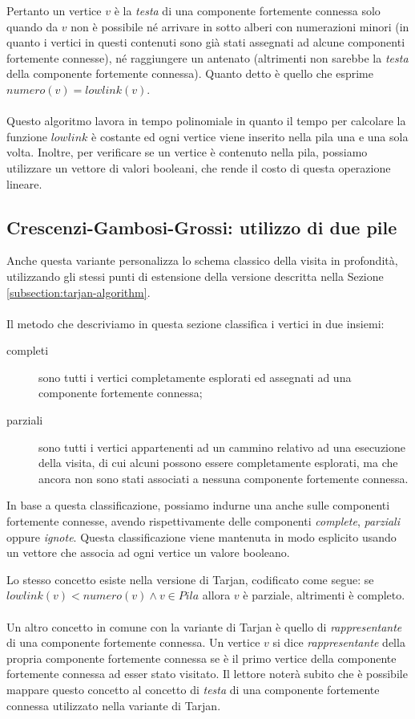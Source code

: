 Pertanto un vertice $v$ \`e la \emph{testa} di una componente
fortemente connessa solo quando da $v$ non \`e possibile n\'e arrivare
in sotto alberi con numerazioni minori (in quanto i vertici in questi
contenuti sono gi\`a stati assegnati ad alcune componenti fortemente
connesse), n\'e raggiungere un antenato (altrimenti non sarebbe la
\emph{testa} della componente fortemente connessa). Quanto detto \`e
quello che esprime $numero(v) = lowlink(v)$.
\\\\
Questo algoritmo lavora in tempo polinomiale in quanto il tempo per
calcolare la funzione $lowlink$ \`e costante ed ogni vertice viene
inserito nella pila una e una sola volta. Inoltre, per verificare se
un vertice \`e contenuto nella pila, possiamo utilizzare un vettore di
valori booleani, che rende il costo di questa operazione lineare.

\subsection{Crescenzi-Gambosi-Grossi: utilizzo di due pile}
\label{subsection:crescenzi-gambosi-grossi}
Anche questa variante personalizza lo schema classico della visita in
profondit\`a, utilizzando gli stessi punti di estensione della
versione descritta nella Sezione \ref{subsection:tarjan-algorithm}.
\\\\
Il metodo che descriviamo in questa sezione classifica i vertici in
due insiemi:
\begin{description}
\item[completi] sono tutti i vertici completamente esplorati ed
  assegnati ad una componente fortemente connessa;
\item[parziali] sono tutti i vertici appartenenti ad un cammino
  relativo ad una esecuzione della visita, di cui alcuni possono
  essere completamente esplorati, ma che ancora non sono stati
  associati a nessuna componente fortemente connessa.
\end{description}
In base a questa classificazione, possiamo indurne una anche sulle
componenti fortemente connesse, avendo rispettivamente delle
componenti \emph{complete}, \emph{parziali} oppure
\emph{ignote}. Questa classificazione viene mantenuta in modo
esplicito usando un vettore che associa ad ogni vertice un valore
booleano. 

Lo stesso concetto esiste nella versione di Tarjan, codificato come
segue: se $lowlink(v) < numero(v) \wedge v \in Pila$ allora $v$ \`e
parziale, altrimenti \`e completo.
\\\\
Un altro concetto in comune con la variante di Tarjan \`e quello di
\emph{rappresentante} di una componente fortemente connessa. Un
vertice $v$ si dice \emph{rappresentante} della propria componente
fortemente connessa se \`e il primo vertice della componente
fortemente connessa ad esser stato visitato. Il lettore noter\`a
subito che \`e possibile mappare questo concetto al concetto di
\emph{testa} di una componente fortemente connessa utilizzato nella
variante di Tarjan.

